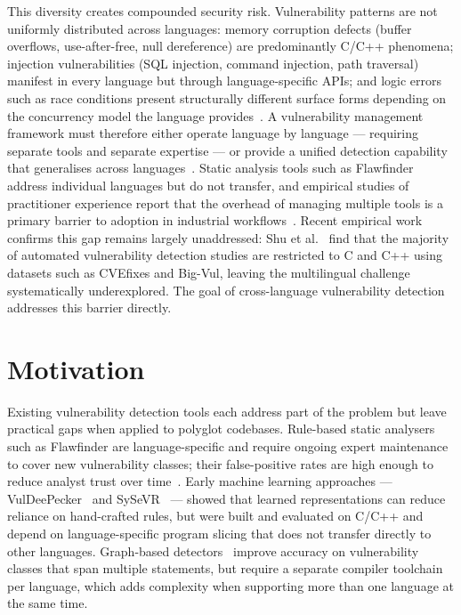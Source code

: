 This diversity creates compounded security risk.
Vulnerability patterns are not uniformly distributed across languages: memory corruption
defects (buffer overflows, use-after-free, null dereference) are predominantly
C/C++ phenomena; injection vulnerabilities (SQL injection, command injection, path
traversal) manifest in every language but through language-specific APIs; and logic
errors such as race conditions present structurally different surface forms depending on
the concurrency model the language provides~\cite{sakharkar2023systematic}.
A vulnerability management framework must therefore either operate language by language
--- requiring separate tools and separate expertise --- or provide a unified detection
capability that generalises across languages~\cite{syed2020cybersecurity}.
Static analysis tools such as Flawfinder~\cite{wheeler2004flawfinder} address individual
languages but do not transfer, and empirical studies of practitioner experience report
that the overhead of managing multiple tools is a primary barrier to adoption in
industrial workflows~\cite{johnson2013don}.
Recent empirical work confirms this gap remains largely unaddressed:
Shu et al.~\cite{shu2026multilingual} find that the majority of automated vulnerability detection
studies are restricted to C and C++ using datasets such as CVEfixes and Big-Vul, leaving
the multilingual challenge systematically underexplored.
The goal of cross-language vulnerability detection addresses this barrier directly.

\section{Motivation}

Existing vulnerability detection tools each address part of the problem but leave
practical gaps when applied to polyglot codebases.
Rule-based static analysers such as Flawfinder are language-specific and require ongoing
expert maintenance to cover new vulnerability classes; their false-positive rates are
high enough to reduce analyst trust over time~\cite{johnson2013don}.
Early machine learning approaches --- VulDeePecker~\cite{li2018vuldeepecker} and
SySeVR~\cite{li2022sysevr} --- showed that learned representations can reduce reliance
on hand-crafted rules, but were built and evaluated on C/C++ and depend on
language-specific program slicing that does not transfer directly to other languages.
Graph-based detectors~\cite{zhou2019devign,chakraborty2022reveal} improve accuracy on
vulnerability classes that span multiple statements, but require a separate compiler
toolchain per language, which adds complexity when supporting more than one language at
the same time.

